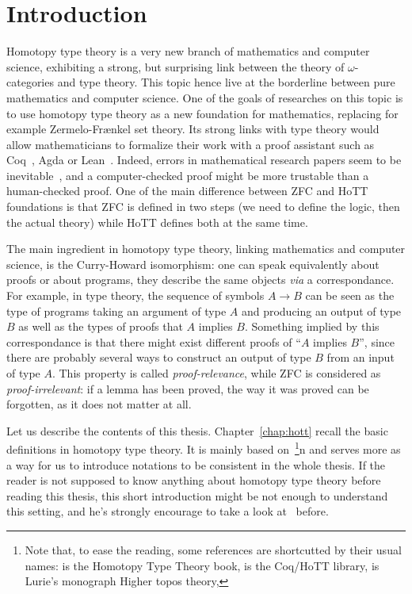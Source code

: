 \chapter{Introduction}
\label{chap:intro}

Homotopy type theory is a very new branch of mathematics and computer
science, exhibiting a strong, but surprising link between the theory
of $\omega$-categories and type theory. This topic hence live at the
borderline between pure mathematics and computer science. One of the
goals of researches on this topic is to use homotopy type theory as a
new foundation for mathematics, replacing for example Zermelo-Frænkel
set theory. Its strong links with type theory would allow
mathematicians to formalize their work with a proof assistant such as
Coq~\cite{coq:refman:8.4}, Agda or
Lean~\cite{lean}. Indeed, errors in mathematical research papers seem
to be inevitable~\cite{vv-univ-f}, and a computer-checked proof might
be more trustable than a human-checked proof. One of the main
difference between ZFC and HoTT foundations is that ZFC is defined in
two steps (we need to define the logic, then the actual theory) while
HoTT defines both at the same time.

The main ingredient in homotopy type theory, linking mathematics and
computer science, is the Curry-Howard isomorphism: one can speak
equivalently about proofs or about programs, they describe the same
objects {\em via} a correspondance. For example, in type theory, the
sequence of symbols $A\to B$ can be seen as the type of programs
taking an argument of type $A$ and producing an output of type $B$ as
well as the types of proofs that $A$ implies $B$. Something implied by
this correspondance is that there might exist different proofs of
``$A$ implies $B$'', since there are probably several ways to
construct an output of type $B$ from an input of type $A$. This
property is called {\em proof-relevance}, while ZFC is considered as
{\em proof-irrelevant}: if a lemma has been proved, the way it was
proved can be forgotten, as it does not matter at all.


Let us describe the contents of this thesis. Chapter~\ref{chap:hott}
recall the basic definitions in homotopy type theory. It is mainly
based on~\cite{hottbook}\footnote{Note that, to ease the reading, some
  references are shortcutted by their usual names: \cite{hottbook} is
  the Homotopy Type Theory book, \cite{hottlib} is the Coq/HoTT
  library, \cite{lurie} is Lurie's monograph Higher topos theory,
  \etc}n and serves more as a way for us to introduce notations to be
consistent in the whole thesis. If the reader is not supposed to know
anything about homotopy type theory before reading this thesis, this
short introduction might be not enough to understand this setting, and
he's strongly encourage to take a look at~\cite{hottbook} before.

